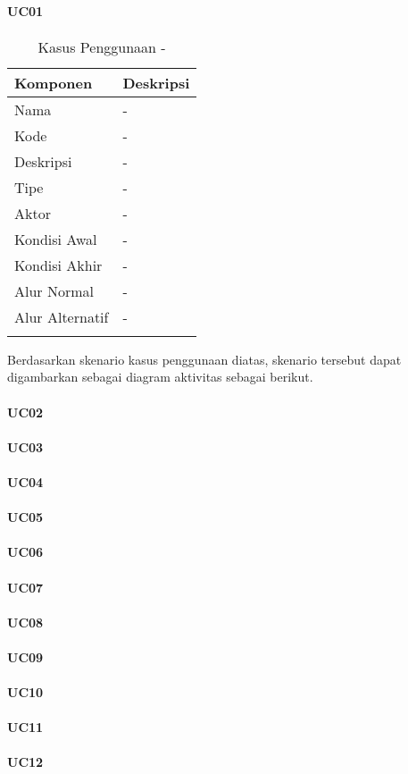         \paragraph{UC01}
        \begin{longtable}{|p{2cm}|p{6cm}|}
            \hline
            \textbf{Komponen} & \textbf{Deskripsi}  \\
            \hline
            Nama & - \\
            \hline
            Kode & - \\
            \hline
            Deskripsi & - \\
            \hline
            Tipe & - \\
            \hline
            Aktor & - \\
            \hline
            Kondisi Awal & - \\
            \hline
            Kondisi Akhir & - \\
            \hline
            Alur Normal & - \\
            \hline
            Alur Alternatif & - \\
            \hline
            \caption{Kasus Penggunaan -}
        \end{longtable}
        Berdasarkan skenario kasus penggunaan diatas, skenario tersebut dapat digambarkan sebagai diagram aktivitas sebagai berikut.
        
        \paragraph{UC02}
        \paragraph{UC03}
        \paragraph{UC04}
        \paragraph{UC05}
        \paragraph{UC06}
        \paragraph{UC07}
        \paragraph{UC08}
        \paragraph{UC09}
        \paragraph{UC10}
        \paragraph{UC11}
        \paragraph{UC12}